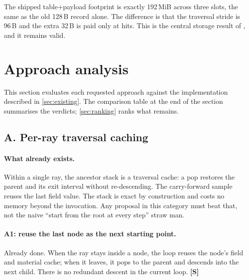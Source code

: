 \documentclass[11pt,a4paper]{article}
\newcommand{\evS}{\textsf{\textbf{\color{evS}[S]}}}
\DeclareRobustCommand{\fpath}[1]{\path{#1}}
\theoremstyle{plain}
\theoremstyle{definition}
\theoremstyle{remark}
\begin{document}
The shipped table+payload footprint is exactly 192\,MiB across three slots,
the same as the old 128\,B record alone. The difference is that the traversal
stride is 96\,B and the extra 32\,B is paid only at hits. This is the central
storage result of \fpath{qef_gpu.tex}, and it remains valid.

\section{Approach analysis}
\label{sec:approaches}

This section evaluates each requested approach against the implementation
described in \cref{sec:existing}. The comparison table at the end of the
section summarises the verdicts; \cref{sec:ranking} ranks what remains.

\subsection{A. Per-ray traversal caching}
\label{sec:A}

\paragraph{What already exists.} Within a single ray, the ancestor stack is a
traversal cache: a pop restores the parent and its exit interval without
re-descending. The carry-forward sample reuses the last field value. The stack
is exact by construction and costs no memory beyond the invocation. Any
proposal in this category must beat that, not the naive ``start from the root
at every step'' straw man.

\paragraph{A1: reuse the last node as the next starting point.} Already done.
When the ray stays inside a node, the loop reuses the node's field and material
cache; when it leaves, it pops to the parent and descends into the next child.
There is no redundant descent in the current loop. \evS
\end{document}
